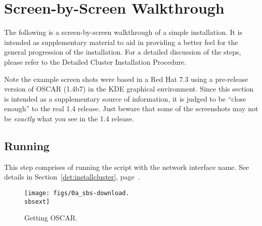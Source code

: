 %
%
%

\newpage

\section{Screen-by-Screen Walkthrough}
\label{app:screen-by-screen}

The following is a screen-by-screen walkthrough of a simple installation.
It is intended as supplementary material to aid in providing a better feel
for the general progression of the installation.  For a detailed discussion
of the steps, please refer to the Detailed Cluster Installation Procedure. 

Note the example screen shots were based in a Red Hat 7.3 using a
pre-release version of OSCAR (1.4b7) in the KDE graphical environment.
Since this section is intended as a supplementary source of
information, it is judged to be ``close enough'' to the real 1.4
release.  Just beware that some of the screenshots may not be {\em
  exactly} what you see in the 1.4 release.






\subsection{Running }

This step comprises of running the  script with
the network interface name.  See details in
Section~\ref{det:installcluster}, page~\pageref{det:installcluster}.

\begin{figure}[htbp]
  \begin{center}
    \centerline{\texttt{[image: figs/0a\_sbs-download.\\sbsext]}}
    \caption{Getting OSCAR.}
    \label{fig:sbs-getting-oscar}
  \end{center}
\end{figure}

